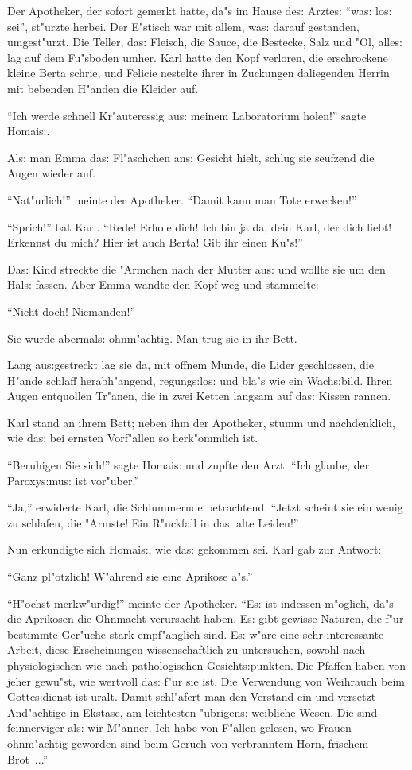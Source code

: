 \documentclass[oneside,12pt]{book}
\newcommand{\s}{s:}%
\begin{document}
Der Apotheker, der sofort gemerkt hatte, da"s im Hause de{\s}
Arzte{\s} "`wa{\s} lo{\s} sei"', st"urzte herbei. Der E"stisch war
mit allem, wa{\s} darauf gestanden, umgest"urzt. Die Teller,
da{\s} Fleisch, die Sauce, die Bestecke, Salz und "Ol, alle{\s}
lag auf dem Fu"sboden umher. Karl hatte den Kopf verloren, die
erschrockene kleine Berta schrie, und Felicie nestelte ihrer in
Zuckungen daliegenden Herrin mit bebenden H"anden die Kleider auf.

"`Ich werde schnell Kr"auteressig au{\s} meinem Laboratorium
holen!"' sagte Homai{\s}.

Al{\s} man Emma da{\s} Fl"aschchen an{\s} Gesicht hielt, schlug
sie seufzend die Augen wieder auf.

"`Nat"urlich!"' meinte der Apotheker. "`Damit kann man Tote
erwecken!"'

"`Sprich!"' bat Karl. "`Rede! Erhole dich! Ich bin ja da, dein
Karl, der dich liebt! Erkennst du mich? Hier ist auch Berta! Gib
ihr einen Ku"s!"'

Da{\s} Kind streckte die "Armchen nach der Mutter au{\s} und
wollte sie um den Hal{\s} fassen. Aber Emma wandte den Kopf weg
und stammelte:

"`Nicht doch! Niemanden!"'

Sie wurde abermal{\s} ohnm"achtig. Man trug sie in ihr Bett.

Lang au{\s}gestreckt lag sie da, mit offnem Munde, die Lider
geschlossen, die H"ande schlaff herabh"angend, regung{\s}lo{\s}
und bla"s wie ein Wach{\s}bild. Ihren Augen entquollen Tr"anen,
die in zwei Ketten langsam auf da{\s} Kissen rannen.

Karl stand an ihrem Bett; neben ihm der Apotheker, stumm und
nachdenklich, wie da{\s} bei ernsten Vorf"allen so herk"ommlich
ist.

"`Beruhigen Sie sich!"' sagte Homai{\s} und zupfte den Arzt. "`Ich
glaube, der Paroxy{\s}mu{\s} ist vor"uber."'

"`Ja,"' erwiderte Karl, die Schlummernde betrachtend. "`Jetzt
scheint sie ein wenig zu schlafen, die "Armste! Ein R"uckfall in
da{\s} alte Leiden!"'

Nun erkundigte sich Homai{\s}, wie da{\s} gekommen sei. Karl gab
zur Antwort:

"`Ganz pl"otzlich! W"ahrend sie eine Aprikose a"s."'

"`H"ochst merkw"urdig!"' meinte der Apotheker. "`E{\s} ist
indessen m"oglich, da"s die Aprikosen die Ohnmacht verursacht
haben. E{\s} gibt gewisse Naturen, die f"ur bestimmte Ger"uche
stark empf"anglich sind. E{\s} w"are eine sehr interessante
Arbeit, diese Erscheinungen wissenschaftlich zu untersuchen,
sowohl nach physiologischen wie nach pathologischen
Gesicht{\s}punkten. Die Pfaffen haben von jeher gewu"st, wie
wertvoll da{\s} f"ur sie ist. Die Verwendung von Weihrauch beim
Gotte{\s}dienst ist uralt. Damit schl"afert man den Verstand ein
und versetzt And"achtige in Ekstase, am leichtesten "ubrigen{\s}
weibliche Wesen. Die sind feinnerviger al{\s} wir M"anner. Ich
habe von F"allen gelesen, wo Frauen ohnm"achtig geworden sind beim
Geruch von verbranntem Horn, frischem Brot~..."'
\end{document}
